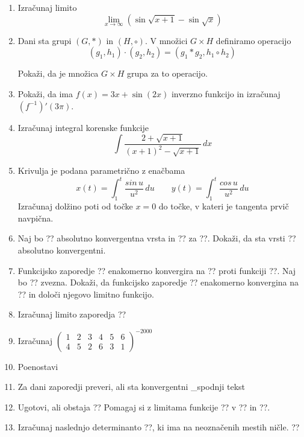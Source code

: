 \documentclass[a4paper,12pt]{article}
\begin{document}
\begin{enumerate}
\item
Izračunaj limito $$\lim_{x\to\infty}(\sin\sqrt{x+1}-\sin\sqrt{x}) $$

\item
Dani sta grupi $(G, \ast) $ in $(H, \circ )$. V množici $G \times H$ definiramo operacijo
 $$(g_1,h_1)\cdot (g_2,h_2)=(g_1\ast g_2,h_1 \circ h_2) $$

Pokaži, da je množica  $G \times H$ grupa za to operacijo.

\item
Pokaži, da ima $f(x)=3x+\sin(2x)$ inverzno funkcijo in izračunaj $(f^{-1})'(3\pi)$.

\item
Izračunaj integral korenske funkcije
$$\int \frac{2+\sqrt{x+1}}{(x+1)^2 - \sqrt{x+1}}\,dx $$

\item
Krivulja je podana parametrično z enačbama
$$x(t)=\int_1^t \frac{sin\,u}{u^2}\,du  \qquad y(t)=\int_1^t \frac{cos\,u}{u^2}\,du $$
Izračunaj dolžino poti od točke $x=0$ do točke, v kateri je tangenta prvič navpična.

\item
Naj bo ?? absolutno konvergentna vrsta in ?? za ??.
Dokaži, da sta vrsti
??
absolutno konvergentni.

\item
Funkcijsko zaporedje ?? enakomerno konvergira na ?? proti funkciji ??.
Naj bo ?? zvezna. Dokaži, da funkcijsko zaporedje ??
enakomerno konvergina na ?? in določi njegovo limitno funkcijo.

\item
Izračunaj limito zaporedja
??

\item
Izračunaj
$
\left(
\begin{array}{cccccc}
	1&2&3&4&5&6\\
	4&5&2&6&3&1
\end{array}
\right)^{-2000}
$

\item
Poenostavi
$$
$$

\item
Za dani zaporedji preveri, ali sta konvergentni
_{spodnji tekst}

\item
Ugotovi, ali obstaja
??
Pomagaj si z limitama funkcije ?? v ?? in ??.

\item
Izračunaj naslednjo determinanto ??, ki ima na neoznačenih mestih ničle.
??


\end{enumerate}
\end{document}
